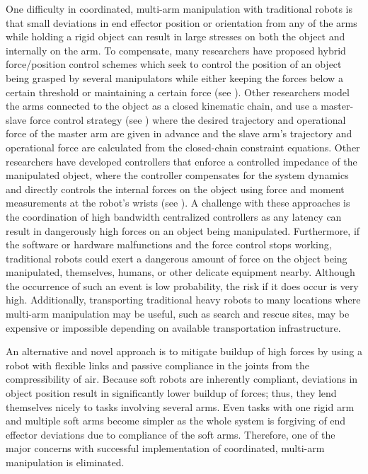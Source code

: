 \documentclass[12pt, letterpaper]{article}
\begin{document}
One difficulty in coordinated, multi-arm manipulation with traditional robots is that small deviations in end effector position or orientation from any of the arms while holding a rigid object can result in large stresses on both the object and internally on the arm. To compensate, many researchers have proposed hybrid force/position control schemes which seek to control the position of an object being grasped by several manipulators while either keeping the forces below a certain threshold or maintaining a certain force (see \cite{Sakaino2011, Alberts1988, Hayati1986, Yoshikawa1993, Uchiyama1988, derventzis1992robust}). Other researchers model the arms connected to the object as a closed kinematic chain, and use a master-slave force control strategy (see \cite{yan2016coordinated}) where the desired trajectory and operational force of the master arm are given in advance and the slave arm's trajectory and operational force are calculated from the closed-chain constraint equations. Other researchers have developed controllers that enforce a controlled impedance of the manipulated object, where the controller compensates for the system dynamics and directly controls the internal forces on the object using force and moment measurements at the robot's wrists (see \cite{schneider1992object, caccavale2008six, erhart2013impedance, ren2016biomimetic}). A challenge with these approaches is the coordination of high bandwidth centralized controllers as any latency can result in dangerously high forces on an object being manipulated. Furthermore, if the software or hardware malfunctions and the force control stops working, traditional robots could exert a dangerous amount of force on the object being manipulated, themselves, humans, or other delicate equipment nearby. Although the occurrence of such an event is low probability, the risk if it does occur is very high. Additionally, transporting traditional heavy robots to many locations where multi-arm manipulation may be useful, such as search and rescue sites, may be expensive or impossible depending on available transportation infrastructure. 

An alternative and novel approach is to mitigate buildup of high forces by using a robot with flexible links and passive compliance in the joints from the compressibility of air. Because soft robots are inherently compliant, deviations in object position result in significantly lower buildup of forces; thus, they lend themselves nicely to tasks involving several arms. Even tasks with one rigid arm and multiple soft arms become simpler as the whole system is forgiving of end effector deviations due to compliance of the soft arms. Therefore, one of the major concerns with successful implementation of coordinated, multi-arm manipulation is eliminated. 
\end{document}
